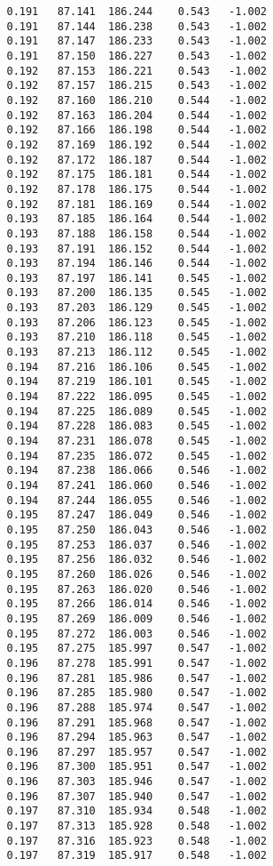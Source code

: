 \begin{verbatim}
   0.191   87.141  186.244    0.543   -1.002
   0.191   87.144  186.238    0.543   -1.002
   0.191   87.147  186.233    0.543   -1.002
   0.191   87.150  186.227    0.543   -1.002
   0.192   87.153  186.221    0.543   -1.002
   0.192   87.157  186.215    0.543   -1.002
   0.192   87.160  186.210    0.544   -1.002
   0.192   87.163  186.204    0.544   -1.002
   0.192   87.166  186.198    0.544   -1.002
   0.192   87.169  186.192    0.544   -1.002
   0.192   87.172  186.187    0.544   -1.002
   0.192   87.175  186.181    0.544   -1.002
   0.192   87.178  186.175    0.544   -1.002
   0.192   87.181  186.169    0.544   -1.002
   0.193   87.185  186.164    0.544   -1.002
   0.193   87.188  186.158    0.544   -1.002
   0.193   87.191  186.152    0.544   -1.002
   0.193   87.194  186.146    0.544   -1.002
   0.193   87.197  186.141    0.545   -1.002
   0.193   87.200  186.135    0.545   -1.002
   0.193   87.203  186.129    0.545   -1.002
   0.193   87.206  186.123    0.545   -1.002
   0.193   87.210  186.118    0.545   -1.002
   0.193   87.213  186.112    0.545   -1.002
   0.194   87.216  186.106    0.545   -1.002
   0.194   87.219  186.101    0.545   -1.002
   0.194   87.222  186.095    0.545   -1.002
   0.194   87.225  186.089    0.545   -1.002
   0.194   87.228  186.083    0.545   -1.002
   0.194   87.231  186.078    0.545   -1.002
   0.194   87.235  186.072    0.545   -1.002
   0.194   87.238  186.066    0.546   -1.002
   0.194   87.241  186.060    0.546   -1.002
   0.194   87.244  186.055    0.546   -1.002
   0.195   87.247  186.049    0.546   -1.002
   0.195   87.250  186.043    0.546   -1.002
   0.195   87.253  186.037    0.546   -1.002
   0.195   87.256  186.032    0.546   -1.002
   0.195   87.260  186.026    0.546   -1.002
   0.195   87.263  186.020    0.546   -1.002
   0.195   87.266  186.014    0.546   -1.002
   0.195   87.269  186.009    0.546   -1.002
   0.195   87.272  186.003    0.546   -1.002
   0.195   87.275  185.997    0.547   -1.002
   0.196   87.278  185.991    0.547   -1.002
   0.196   87.281  185.986    0.547   -1.002
   0.196   87.285  185.980    0.547   -1.002
   0.196   87.288  185.974    0.547   -1.002
   0.196   87.291  185.968    0.547   -1.002
   0.196   87.294  185.963    0.547   -1.002
   0.196   87.297  185.957    0.547   -1.002
   0.196   87.300  185.951    0.547   -1.002
   0.196   87.303  185.946    0.547   -1.002
   0.196   87.307  185.940    0.547   -1.002
   0.197   87.310  185.934    0.548   -1.002
   0.197   87.313  185.928    0.548   -1.002
   0.197   87.316  185.923    0.548   -1.002
   0.197   87.319  185.917    0.548   -1.002

\end{verbatim}

